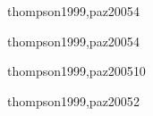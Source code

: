 \begin{syllabus}
\begin{unit}{\ALTHREEDef}{thompson1999,paz2005}{4}
   \begin{unitgoals}
      \item \ALTHREEObjONE
      \item \ALTHREEObjTWO
      \item \ALTHREEObjFOUR
   \end{unitgoals}
\end{unit}

\begin{unit}{\PLFIVEDef}{thompson1999,paz2005}{4}
   \begin{topics}
      \item \PLFIVETopicProcedimientos
      \item \PLFIVETopicParametros
      \item \PLFIVETopicModulos
   \end{topics}
   \begin{unitgoals}
      \item \PLFIVEObjONE
      \item \PLFIVEObjTHREE
   \end{unitgoals}
\end{unit}

\begin{unit}{\PFTHREEDef}{thompson1999,paz2005}{10}
   \begin{topics}
      \item \PFTHREETopicTipos
      \item \PFTHREETopicCadenas
      \item \PFTHREETopicRepresentacion
      \item \PFTHREETopicEstructuras
   \end{topics}
   \begin{unitgoals}
      \item \PFTHREEObjONE
      \item \PFTHREEObjTHREE
      \item \PFTHREEObjFIVE
      \item \PFTHREEObjSEVEN
   \end{unitgoals}
\end{unit}

\begin{unit}{\DSFIVEDef}{thompson1999,paz2005}{2}
   \begin{topics}
      \item \DSFIVETopicGrafos
      \item \DSFIVETopicGrafosdirigidos
      \item \DSFIVETopicArbolesde
   \end{topics}
   \begin{unitgoals}
      \item \DSFIVEObjONE
   \end{unitgoals}
\end{unit}


\end{syllabus}
